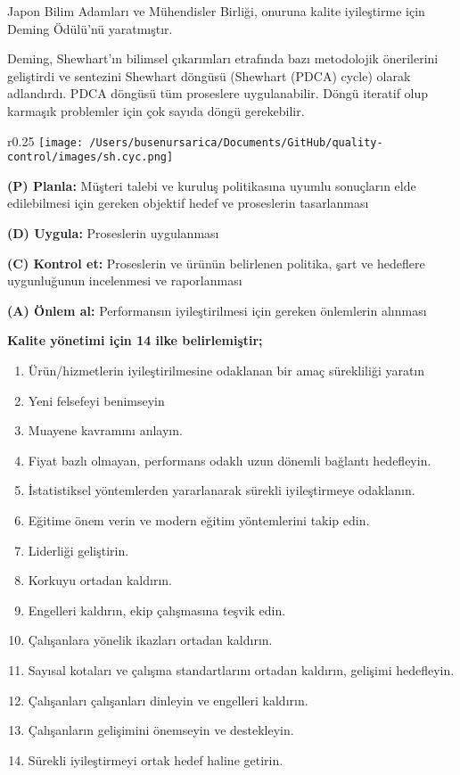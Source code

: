 \documentclass[
]{book}
\begin{document}
Japon Bilim Adamları ve Mühendisler Birliği, onuruna kalite iyileştirme için Deming Ödülü'nü yaratmıştır.

Deming, Shewhart'ın bilimsel çıkarımları etrafında bazı metodolojik önerilerini geliştirdi ve sentezini Shewhart döngüsü (Shewhart (PDCA) cycle) olarak adlandırdı. PDCA döngüsü tüm proseslere uygulanabilir. Döngü iteratif olup karmaşık problemler için çok sayıda döngü gerekebilir.

\vspace{0.3cm}

\begin{wrapfigure}{r}{0.25\textwidth}
\texttt{[image: /Users/busenursarica/Documents/GitHub/quality-control/images/sh.cyc.png]}
\end{wrapfigure}


\textbf{(P) Planla:} Müşteri talebi ve kuruluş politikasına uyumlu sonuçların elde edilebilmesi için gereken objektif hedef ve proseslerin tasarlanması

\textbf{(D) Uygula:} Proseslerin uygulanması

\textbf{(C) Kontrol et:} Proseslerin ve ürünün belirlenen politika, şart ve hedeflere uygunluğunun incelenmesi ve raporlanması

\textbf{(A) Önlem al:} Performansın iyileştirilmesi için gereken önlemlerin alınması

\pagebreak

\textbf{Kalite yönetimi için 14 ilke belirlemiştir;}

\begin{enumerate}
\def\labelenumi{\arabic{enumi}.}
\item
  Ürün/hizmetlerin iyileştirilmesine odaklanan bir amaç sürekliliği yaratın
\item
  Yeni felsefeyi benimseyin
\item
  Muayene kavramını anlayın.
\item
  Fiyat bazlı olmayan, performans odaklı uzun dönemli bağlantı hedefleyin.
\item
  İstatistiksel yöntemlerden yararlanarak sürekli iyileştirmeye odaklanın.
\item
  Eğitime önem verin ve modern eğitim yöntemlerini takip edin.
\item
  Liderliği geliştirin.
\item
  Korkuyu ortadan kaldırın.
\item
  Engelleri kaldırın, ekip çalışmasına teşvik edin.
\item
  Çalışanlara yönelik ikazları ortadan kaldırın.
\item
  Sayısal kotaları ve çalışma standartlarını ortadan kaldırın, gelişimi hedefleyin.
\item
  Çalışanları çalışanları dinleyin ve engelleri kaldırın.
\item
  Çalışanların gelişimini önemseyin ve destekleyin.
\item
  Sürekli iyileştirmeyi ortak hedef haline getirin.
\end{enumerate}
\end{document}

